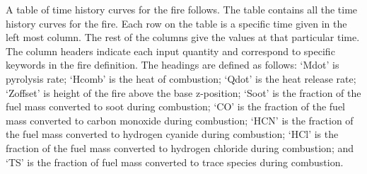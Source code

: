 A table of time history curves for the fire follows.  The table contains all the time history curves for the fire.  Each row on the table is a specific time given in the left most column.  The rest of the columns give the values at that particular time.  The column headers indicate each input quantity and correspond to specific keywords in the fire definition. The headings are defined as follows: `Mdot' is pyrolysis rate; `Hcomb' is the heat of combustion; `Qdot' is the heat release rate; `Zoffset' is height of the fire above the base z-position; `Soot' is the fraction of the fuel mass converted to soot during combustion; `CO' is the fraction of the fuel mass converted to carbon monoxide during combustion; `HCN' is the fraction of the fuel mass converted to hydrogen cyanide during combustion; `HCl' is the fraction of the fuel mass converted to hydrogen chloride during combustion; and `TS' is the fraction of fuel mass converted to trace species during combustion.
